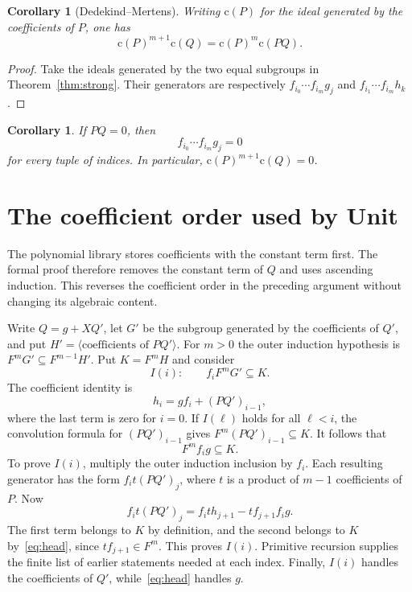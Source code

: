 \documentclass[11pt]{amsart}
\newtheorem{corollary}[theorem]{Corollary}
\newcommand{\content}{\mathrm{c}}
\begin{document}
\begin{corollary}[Dedekind--Mertens]
Writing $\content(P)$ for the ideal generated by the coefficients of
$P$, one has
\[
 \content(P)^{m+1}\content(Q)=\content(P)^m\content(PQ).
\]
\end{corollary}
\begin{proof}
Take the ideals generated by the two equal subgroups in
Theorem~\ref{thm:strong}. Their generators are respectively
$f_{i_0}\cdots f_{i_m}g_j$ and
$f_{i_1}\cdots f_{i_m}h_k$.
\end{proof}

\begin{corollary}\label{cor:zero}
If $PQ=0$, then
\[
 f_{i_0}\cdots f_{i_m}g_j=0
\]
for every tuple of indices. In particular,
$\content(P)^{m+1}\content(Q)=0$.
\end{corollary}

\section{The coefficient order used by Unit}

The polynomial library stores coefficients with the constant term
first. The formal proof therefore removes the constant term of $Q$
and uses ascending induction. This reverses the coefficient order
in the preceding argument without changing its algebraic content.

Write $Q=g+XQ'$, let $G'$ be the subgroup generated by the
coefficients of $Q'$, and put $H'=\langle\text{coefficients of }PQ'\rangle$.
For $m>0$ the outer induction hypothesis is
$F^mG'\subseteq F^{m-1}H'$. Put $K=F^mH$ and consider
\[
 I(i):\qquad f_iF^mG'\subseteq K.
\]
The coefficient identity is
\[
 h_i=g f_i+(PQ')_{i-1},
\]
where the last term is zero for $i=0$.
If $I(\ell)$ holds for all $\ell<i$, the convolution formula for
$(PQ')_{i-1}$ gives
$F^m(PQ')_{i-1}\subseteq K$. It follows that
\begin{equation}\label{eq:head}
 F^m f_i g\subseteq K.
\end{equation}
To prove $I(i)$, multiply the outer induction inclusion by $f_i$.
Each resulting generator has the form $f_i t(PQ')_j$, where $t$
is a product of $m-1$ coefficients of $P$. Now
\[
 f_i t(PQ')_j=f_i t h_{j+1}-t f_{j+1}f_i g.
\]
The first term belongs to $K$ by definition, and the second belongs
to $K$ by~\eqref{eq:head}, since $tf_{j+1}\in F^m$.
This proves $I(i)$. Primitive recursion supplies the finite list of
earlier statements needed at each index. Finally, $I(i)$ handles
the coefficients of $Q'$, while~\eqref{eq:head} handles $g$.
\end{document}
